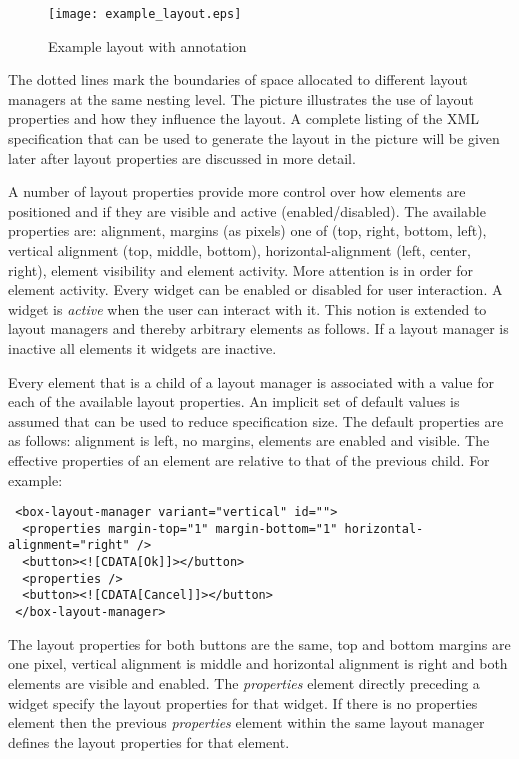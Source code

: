 \documentclass{article}
\begin{document}
   \begin{figure}[H]
    \begin{center}
     \texttt{[image: example\_layout.eps]}
    \end{center}
    \caption{Example layout with annotation}
   \end{figure}

   \noindent The dotted lines mark the boundaries of space allocated to
   different layout managers at the same nesting level. The picture illustrates
   the use of layout properties and how they influence the layout. A complete
   listing of the XML specification that can be used to generate the layout in
   the picture will be given later after layout properties are discussed in
   more detail.

   A number of layout properties provide more control over how elements are
   positioned and if they are visible and active (enabled/disabled). The
   available properties are: alignment, margins (as pixels) one of (top, right,
   bottom, left), vertical alignment (top, middle, bottom),
   horizontal-alignment (left, center, right), element visibility and element
   activity.
   More attention is in order for element activity. Every widget can be
   enabled or disabled for user interaction. A widget is \textit{active} when
   the user can interact with it. This notion is extended to layout managers
   and thereby arbitrary elements as follows. If a layout manager is inactive
   all elements it widgets are inactive.
   
   Every element that is a child of a layout manager is associated with a value
   for each of the available layout properties. An implicit set of default
   values is assumed that can be used to reduce specification size.
   The default properties are as follows: alignment is left, no margins,
   elements are enabled and visible. The effective properties of an element are
   relative to that of the previous child. For example:

   \enlargethispage{-\baselineskip}

   \small \begin{verbatim}
 <box-layout-manager variant="vertical" id="">
  <properties margin-top="1" margin-bottom="1" horizontal-alignment="right" />
  <button><![CDATA[Ok]]></button>
  <properties />
  <button><![CDATA[Cancel]]></button>
 </box-layout-manager>\end{verbatim}
 \normalsize

   \noindent The layout properties for both buttons are the same, top and bottom margins
   are one pixel, vertical alignment is middle and horizontal alignment is right
   and both elements are visible and enabled. The \textit{properties} element
   directly preceding a widget specify the layout properties for that widget. If
   there is no properties element then the previous \textit{properties} element
   within the same layout manager defines the layout properties for that
   element.
\end{document}
